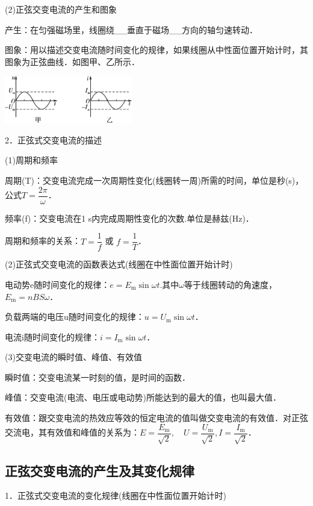 \documentclass[cn,10.5pt,chinese,mac,chinesefont=founder]{elegantbook}
\begin{document}
(2)正弦交变电流的产生和图象

产生：在匀强磁场里，线圈绕\_\_垂直于磁场\_\_方向的轴匀速转动．

图象：用以描述交变电流随时间变化的规律，如果线圈从中性面位置开始计时，其图象为正弦曲线．如图甲、乙所示．

\begin{center}\includegraphics[width=2.19792in,height=0.81111in]{media/image437.png}\end{center}

2．正弦式交变电流的描述

(1)周期和频率

周期(T)：交变电流完成一次周期性变化(线圈转一周)所需的时间，单位是秒(s)，公式$T=\dfrac{2 \pi}{\omega}$．

频率(f)：交变电流在1 s内完成周期性变化的次数.单位是赫兹(Hz)．

周期和频率的关系：$T=\dfrac{1}{f}$ 或 $f=\dfrac{1}{T}$．

(2)正弦式交变电流的函数表达式(线圈在中性面位置开始计时)

电动势e随时间变化的规律：$e=E_{\mathrm{m}} \sin \omega t$.其中$\omega$等于线圈转动的角速度，$E_{\mathrm{m}}=n B S \omega$．

负载两端的电压u随时间变化的规律：$u=U_{\mathrm{m}} \sin \omega t$．

电流i随时间变化的规律：$i=I_{\mathrm{m}} \sin \omega t$．

(3)交变电流的瞬时值、峰值、有效值

瞬时值：交变电流某一时刻的值，是时间的函数．

峰值：交变电流(电流、电压或电动势)所能达到的最大的值，也叫最大值．

有效值：跟交变电流的热效应等效的恒定电流的值叫做交变电流的有效值．对正弦交流电，其有效值和峰值的关系为：$E=\dfrac{E_{\mathrm{m}}}{\sqrt{2}}, \quad U=\dfrac{U_{\mathrm{m}}}{\sqrt{2}}, I=\dfrac{I_{\mathrm{m}}}{\sqrt{2}}$．
\newpage
\subsection{正弦交变电流的产生及其变化规律}

1．正弦式交变电流的变化规律(线圈在中性面位置开始计时)
\end{document}
